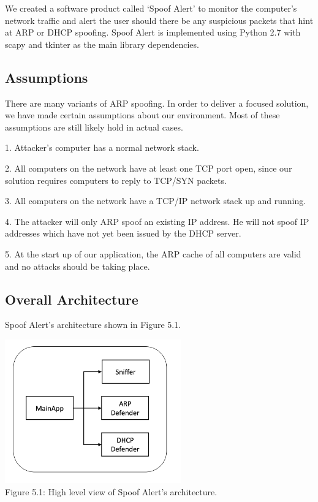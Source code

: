 \documentclass{acm_proc_article-sp}
\begin{document}
We created a software product called `Spoof Alert' to monitor the computer's network traffic and alert the user should there be any suspicious packets that hint at ARP or DHCP spoofing. Spoof Alert is implemented using Python 2.7 with scapy and tkinter as the main library dependencies.

\subsection{Assumptions}

There are many variants of ARP spoofing. In order to deliver a focused solution, we have made certain assumptions about our environment. Most of these assumptions are still likely hold in actual cases.

1. Attacker's computer has a normal network stack. 

2. All computers on the network have at least one TCP port open, since our solution requires computers to reply to TCP/SYN packets.

3. All computers on the network have a TCP/IP network stack up and running. 

4. The attacker will only ARP spoof an existing IP address. He will not spoof IP addresses which have not yet been issued by the DHCP server. 

5. At the start up of our application, the ARP cache of all computers are valid and no attacks should be taking place.


\subsection{Overall Architecture}
Spoof Alert's architecture shown in Figure 5.1. 

\includegraphics[width=3in]{architecture01.png} \\
Figure 5.1: High level view of Spoof Alert's architecture.
\end{document}
